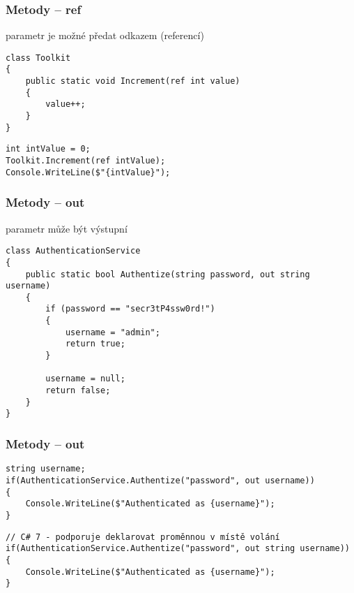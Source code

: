 \begin{frame}[fragile]
\frametitle{Metody -- ref}
\begin{bitemize}{}
\item parametr je možné předat odkazem (referencí)
\end{bitemize}

\begin{yesblock}
\begin{lstlisting}[basicstyle=\small]
class Toolkit
{
    public static void Increment(ref int value)
    {
        value++;
    }
}
\end{lstlisting}
\end{yesblock}

\begin{yesblock}
\begin{lstlisting}[basicstyle=\small]
int intValue = 0;
Toolkit.Increment(ref intValue);
Console.WriteLine($"{intValue}");
\end{lstlisting}
\end{yesblock}
\end{frame}



\begin{frame}[fragile]
\frametitle{Metody -- out}
\begin{bitemize}{}
\item parametr může být výstupní
\end{bitemize}

\begin{yesblock}
\begin{lstlisting}[basicstyle=\small]
class AuthenticationService
{
    public static bool Authentize(string password, out string username)
    {
        if (password == "secr3tP4ssw0rd!")
        {
            username = "admin";
            return true;
        }

        username = null;
        return false;
    }
}
\end{lstlisting}
\end{yesblock}
\end{frame}

\begin{frame}[fragile]
\frametitle{Metody -- out}

\begin{yesblock}
\begin{lstlisting}[basicstyle=\small]
string username;
if(AuthenticationService.Authentize("password", out username))
{
    Console.WriteLine($"Authenticated as {username}");
}
\end{lstlisting}
\end{yesblock}

\begin{yesblock}
\begin{lstlisting}[basicstyle=\small]
// C# 7 - podporuje deklarovat proměnnou v místě volání
if(AuthenticationService.Authentize("password", out string username))
{
    Console.WriteLine($"Authenticated as {username}");
}
\end{lstlisting}
\end{yesblock}
\end{frame}




